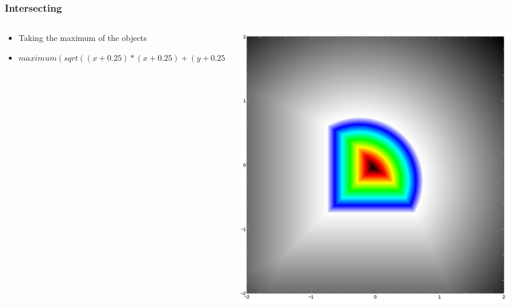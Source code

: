 \documentclass{beamer}
\begin{document}
\begin{frame}
\frametitle{Intersecting}
\begin{columns}
  \begin{column}{0.75\textwidth}
    \begin{itemize}
    \item Taking the maximum of the objects
    \item $maximum(sqrt((x+0.25)*(x+0.25)+(y+0.25)*(y+0.25))-1,maximum(abs(x-0.25),abs(y-0.25))-1)$
    \end{itemize}
  \end{column}
  \begin{column}{0.25\textwidth}
    \includegraphics[width=1.0\textwidth, right]{implicit_intersection_square_circle.jpg}
  \end{column}
\end{columns}
\end{frame}
\end{document}
